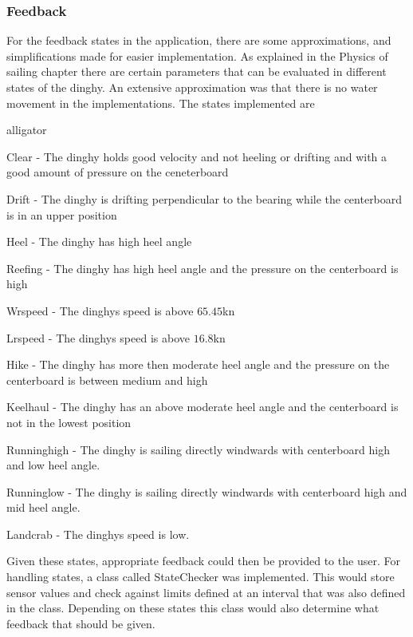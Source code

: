 \subsubsection{Feedback}
For the feedback states in the application, there are some approximations, and simplifications made for easier implementation. As explained in the Physics of sailing chapter there are certain parameters that can be evaluated in different states of the dinghy. An extensive approximation was that there is no water movement in the implementations. The states implemented are
\begin{labeling}{alligator}
\item [Clear] - The dinghy holds good velocity and not heeling or drifting and with a good amount of pressure on the ceneterboard
\item [Drift] - The dinghy is drifting perpendicular to the bearing while the centerboard is in an upper position
\item [Heel] - The dinghy has high heel angle
\item [Reefing] - The dinghy has high heel angle and the pressure on the centerboard is high
\item [Wrspeed] - The dinghys speed is above $65.45$kn
\item [Lrspeed] - The dinghys speed is above $16.8$kn
\item [Hike] - The dinghy has more then moderate heel angle and the pressure on the centerboard is between medium and high
\item [Keelhaul] - The dinghy has an above moderate heel angle and the centerboard is not in the lowest position
\item [Runninghigh] - The dinghy is sailing directly windwards with centerboard high and low heel angle.
\item [Runninglow] - The dinghy is sailing directly windwards with centerboard high and mid heel angle.
\item [Landcrab] - The dinghys speed is low.
\end{labeling}
Given these states, appropriate feedback could then be provided to the user. For handling states, a class called StateChecker was implemented. This would store sensor values and check against limits defined at an interval that was also defined in the class. Depending on these states this class would also determine what feedback that should be given.


